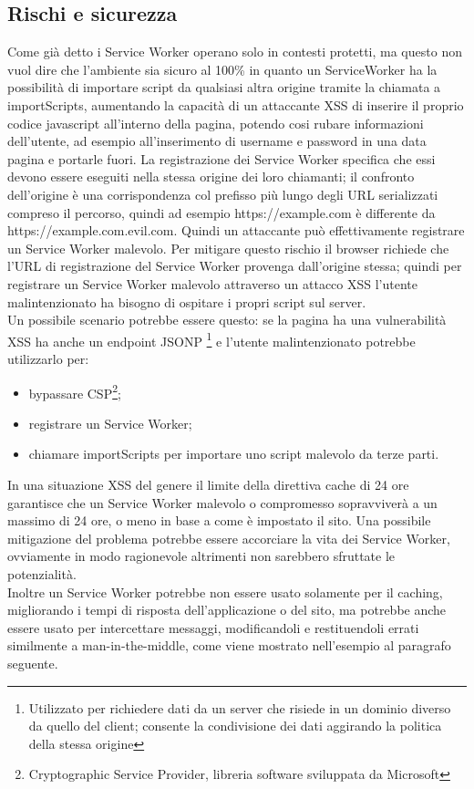 \documentclass[11pt ,a4paper , twoside , openright ]{article}
\begin{document}
\subsection{Rischi e sicurezza}
Come già detto i Service Worker operano solo in contesti protetti, ma questo non vuol dire che l'ambiente sia sicuro al 100\% in quanto un ServiceWorker ha la possibilità di importare script da qualsiasi altra origine tramite la chiamata a importScripts, aumentando la capacità di un attaccante XSS di inserire il proprio codice javascript all'interno della pagina, potendo cosi rubare informazioni dell'utente, ad esempio all'inserimento di username e password in una data pagina e portarle fuori. La registrazione dei Service Worker specifica che essi devono essere eseguiti nella stessa origine dei loro chiamanti; il confronto dell'origine è una corrispondenza col prefisso più lungo degli URL serializzati compreso il percorso, quindi ad esempio https://example.com è differente da https://example.com.evil.com. Quindi un attaccante può effettivamente registrare un Service Worker malevolo. Per mitigare questo rischio il browser richiede che l'URL di registrazione del Service Worker provenga dall'origine stessa; quindi per registrare un Service Worker malevolo attraverso un attacco XSS l'utente malintenzionato ha bisogno di ospitare i propri script sul server.
\\
Un possibile scenario potrebbe essere questo: se la pagina ha una vulnerabilità XSS ha anche un endpoint JSONP \footnote{Utilizzato per richiedere dati da un server che risiede in un dominio diverso da quello del client; consente la condivisione dei dati aggirando la politica della stessa origine} e l'utente malintenzionato potrebbe utilizzarlo per:
\begin{itemize}
	\item bypassare CSP\footnote{Cryptographic Service Provider, libreria software sviluppata da Microsoft};
	\item registrare un Service Worker; 
	\item chiamare importScripts per importare uno script malevolo da terze parti.
\end{itemize}
In una situazione XSS del genere il limite della direttiva cache di 24 ore garantisce che un Service Worker malevolo o compromesso sopravviverà a un massimo di 24 ore, o meno in base a come è impostato il sito. Una possibile mitigazione del problema potrebbe essere accorciare la vita dei Service Worker, ovviamente in modo ragionevole altrimenti non sarebbero sfruttate le potenzialità.
\\
Inoltre un Service Worker potrebbe non essere usato solamente per il caching, migliorando i tempi di risposta dell'applicazione o del sito, ma potrebbe anche essere usato per intercettare messaggi, modificandoli e restituendoli errati similmente a man-in-the-middle, come viene mostrato nell'esempio al paragrafo seguente.
\end{document}
